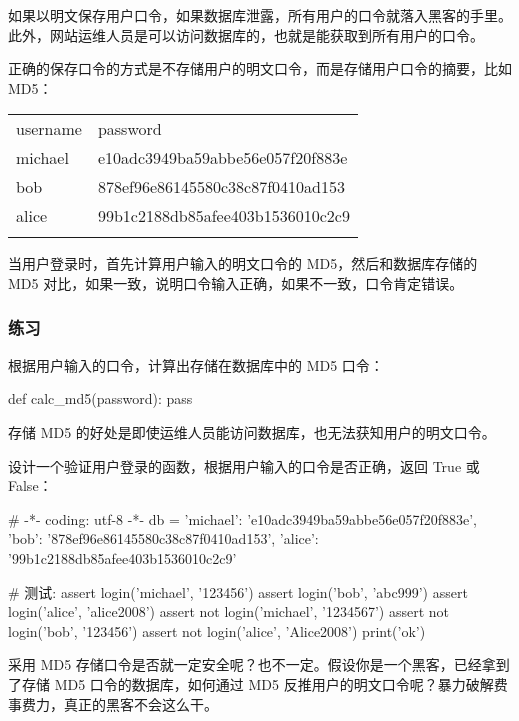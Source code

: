 如果以明文保存用户口令，如果数据库泄露，所有用户的口令就落入黑客的手里。此外，网站运维人员是可以访问数据库的，也就是能获取到所有用户的口令。

正确的保存口令的方式是不存储用户的明文口令，而是存储用户口令的摘要，比如
MD5：

\begin{longtable}[]{@{}ll@{}}
\toprule
username & password \\ \addlinespace
\midrule
\endhead
michael & e10adc3949ba59abbe56e057f20f883e \\ \addlinespace
bob & 878ef96e86145580c38c87f0410ad153 \\ \addlinespace
alice & 99b1c2188db85afee403b1536010c2c9 \\ \addlinespace
\bottomrule
\end{longtable}

当用户登录时，首先计算用户输入的明文口令的 MD5，然后和数据库存储的 MD5
对比，如果一致，说明口令输入正确，如果不一致，口令肯定错误。

\hypertarget{ux7ec3ux4e60}{%
\subsubsection{练习}\label{ux7ec3ux4e60}}

根据用户输入的口令，计算出存储在数据库中的 MD5 口令：

\begin{pythoncode}
def calc_md5(password):
    pass
\end{pythoncode}

存储 MD5 的好处是即使运维人员能访问数据库，也无法获知用户的明文口令。

设计一个验证用户登录的函数，根据用户输入的口令是否正确，返回 True 或
False：

\begin{pythoncode}
# -*- coding: utf-8 -*-
db = {
    'michael': 'e10adc3949ba59abbe56e057f20f883e',
    'bob': '878ef96e86145580c38c87f0410ad153',
    'alice': '99b1c2188db85afee403b1536010c2c9'
}
\end{pythoncode}

\begin{pythoncode}
# 测试:
assert login('michael', '123456')
assert login('bob', 'abc999')
assert login('alice', 'alice2008')
assert not login('michael', '1234567')
assert not login('bob', '123456')
assert not login('alice', 'Alice2008')
print('ok')
\end{pythoncode}

采用 MD5
存储口令是否就一定安全呢？也不一定。假设你是一个黑客，已经拿到了存储 MD5
口令的数据库，如何通过 MD5
反推用户的明文口令呢？暴力破解费事费力，真正的黑客不会这么干。

